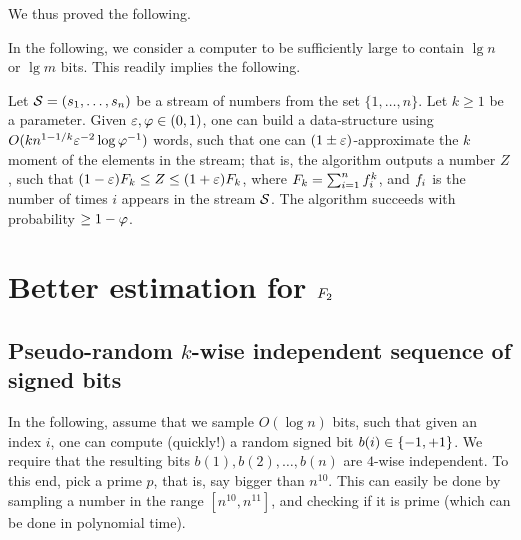 

We thus proved the following.


In the following, we consider a computer  to be
sufficiently large to contain $\lg n$ or $\lg m$ bits. This readily
implies the following.
\begin{theorem}
    Let $\mathcal{S}=({s}_1, \ldots, {s}_n)$ be a stream of numbers from
    the set $\{1,\ldots, n\}$. Let $k \geq 1$ be a parameter. Given
    ${\varepsilon}, \varphi \in (0,1)$, one can build a data-structure using
    $O( kn^{1-1/k}{\varepsilon}^{-2} \log \varphi^{-1})$ words, such that one
    can $(1\pm {\varepsilon})$-approximate the $k$\th moment of the elements in
    the stream; that is, the algorithm outputs a number $Z$, such that
    $(1-{\varepsilon})F_k \leq Z \leq (1+{\varepsilon})F_k$, where
    $F_k = \sum_{i=1}^n f_i^k$, and $f_i$ is the number of
    times $i$ appears in the stream $\mathcal{S}$. The algorithm succeeds
    with probability $\geq 1- \varphi$.
\end{theorem}




\section{Better estimation for $F_2$}

\subsection{Pseudo-random $k$-wise independent %
   sequence of signed bits}

In the following, assume that we sample $O( \log n)$ bits, such that
given an index $i$, one can compute (quickly!) a random signed bit
$b(i) \in \left\{ {-1,+1} \right\}$. We require that the resulting bits
$b(1), b(2), \ldots, b(n)$ are $4$-wise independent.  To this end,
pick a prime $p$, that is, say bigger than $n^{10}$. This can easily
be done by sampling a number in the range $[n^{10}, n^{11}]$, and
checking if it is prime (which can be done in polynomial time).

